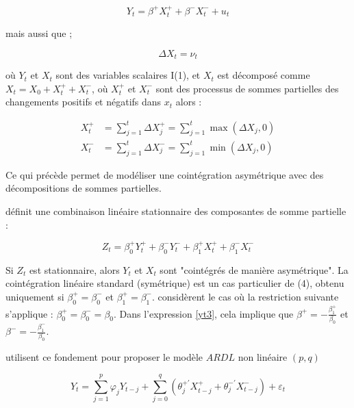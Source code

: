 \begin{sloppypar}
\begin{equation}
   Y_t = \beta^+ X_t^+ + \beta^- X_t^- + u_t  
\end{equation}

mais aussi que ;

\begin{equation}
    \Delta X_t = \nu_t
\end{equation}

où \( Y_t \) et \( X_t \) sont des variables scalaires I(1), et \( X_t \) est décomposé comme \( X_t = X_0 + X_t^+ + X_t^- \), où \( X_t^+ \) et \( X_t^- \) sont des processus de sommes partielles des changements positifs et négatifs dans $x_t$ alors : 

\begin{equation}
    \begin{split}
      X_t^+ &= \sum_{j=1}^t \Delta X_j^+ = \sum_{j=1}^t \max (\Delta X_j, 0) \\
      X_t^- &= \sum_{j=1}^t \Delta X_j^- = \sum_{j=1}^t \min (\Delta X_j, 0)
    \end{split}
\end{equation}

Ce qui précède permet de modéliser une cointégration asymétrique avec des décompositions de sommes partielles.

\cite{Schorderet} définit une combinaison linéaire stationnaire des composantes de somme partielle :

\begin{equation}
     Z_t = \beta^+_0 Y_t^+ + \beta^-_0 Y_t^- + \beta^+_1 X_t^+ + \beta^-_1 X_t^-
     \label{yt3}
\end{equation}

Si \( Z_t \) est stationnaire, alors \( Y_t \) et \( X_t \) sont "cointégrés de manière asymétrique". La cointégration linéaire standard (symétrique) est un cas particulier de (4), obtenu uniquement si \( \beta^+_0 = \beta^-_0 \) et \( \beta^+_1 = \beta^-_1 \). \cite{Shin} considèrent le cas où la restriction suivante s'applique : \( \beta^+_0 = \beta^-_0 = \beta_0 \). Dans l'expression \eqref{yt3}, cela implique que \( \beta^+ = -\frac{\beta^+_1}{\beta_0} \) et \( \beta^- = -\frac{\beta^-_1}{\beta_0} \).

\cite{Shin} utilisent ce fondement pour proposer le modèle $ARDL$ non linéaire $(p,q)$

\begin{equation}
    Y_t = \sum_{j=1}^p \varphi_j Y_{t-j} + \sum_{j=0}^q \left (\theta_j^{+'} X_{t-j}^+ +\theta_j^{-'} X_{t-j}^- \right ) +\varepsilon_t 
\end{equation}


\end{sloppypar}
